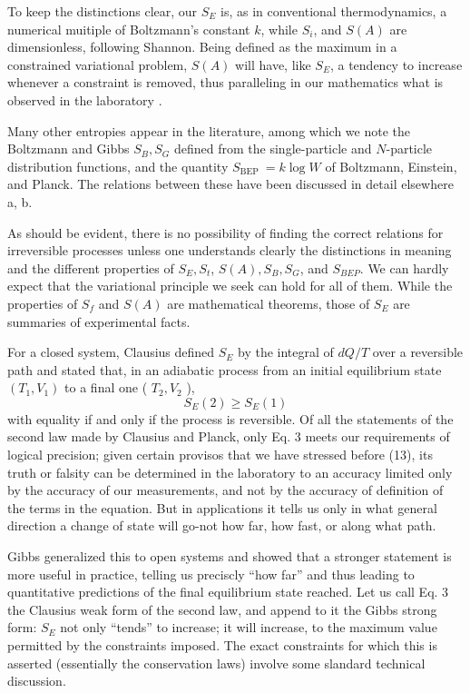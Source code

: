 \documentclass{article}
\begin{document}
To keep the distinctions clear, our $S_E$ is, as in conventional thermodynamics, a numerical muitiple of Boltzmann's constant $k$, while $S_i$, and $S(A)$ are dimensionless, following Shannon. Being defined as the maximum in a constrained variational problem, $S(A)$ will have, like $S_E$, a tendency to increase whenever a constraint is removed, thus paralleling in our mathematics what is observed in the laboratory \cite{jaynes1963}.

Many other entropies appear in the literature, among which we note the Boltzmann and Gibbs $S_B, S_G$ defined from the single-particle and $N$-particle distribution functions, and the quantity $S_{\text {BEP }}=k \log W$ of Boltzmann, Einstein, and Planck. The relations between these have been discussed in detail elsewhere \cite{jaynes1965} a, b.

As should be evident, there is no possibility of finding the correct relations for irreversible processes unless one understands clearly the distinctions in meaning and the different properties of $S_E, S_t$, $S(A), S_B, S_G$, and $S_{B E P}$. We can hardly expect that the variational principle we seek can hold for all of them. While the properties of $S_f$ and $S(A)$ are mathematical theorems, those of $S_E$ are summaries of experimental facts.

For a closed system, Clausius defined $S_E$ by the integral of $d Q / T$ over a reversible path and stated that, in an adiabatic process from an initial equilibrium state $\left(T_1, V_1\right)$ to a final one ( $T_2, V_2$ ),
$$
S_E(2) \geqslant S_E(1)
$$
with equality if and only if the process is reversible. Of all the statements of the second law made by Clausius and Planck, only Eq. 3 meets our requirements of logical precision; given certain provisos that we have stressed before (13), its truth or falsity can be determined in the laboratory to an accuracy limited only by the accuracy of our measurements, and not by the accuracy of definition of the terms in the equation. But in applications it tells us only in what general direction a change of state will go-not how far, how fast, or along what path.

Gibbs \cite{gibbs1876} generalized this to open systems and showed that a stronger statement is more useful in practice, telling us preciscly ``how far'' and thus leading to quantitative predictions of the final equilibrium state reached. Let us call Eq. 3 the Clausius weak form of the second law, and append to it the Gibbs strong form: $S_E$ not only ``tends'' to increase; it will increase, to the maximum value permitted by the constraints imposed. The exact constraints for which this is asserted (essentially the conservation laws) involve some slandard technical discussion.
\end{document}
